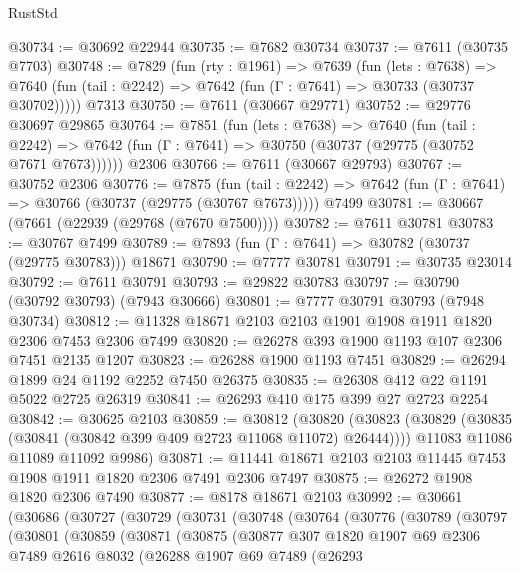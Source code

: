 \begin{lexlean}{RustStd}
\begin{coremodule}
{\begin{coremodule}
{{{{{{{{{{{{{{{{{{{{{{{{{{{{{{{{{{@30734 := @30692 @22944
@30735 := @7682 @30734
@30737 := @7611 (@30735 @7703)
@30748 := @7829
    (fun (rty : @1961) =>
    @7639
      (fun (lets : @7638) =>
      @7640 (fun (tail : @2242) => @7642 (fun (Γ : @7641) => @30733 (@30737 @30702)))))
    @7313
@30750 := @7611 (@30667 @29771)
@30752 := @29776 @30697 @29865
@30764 := @7851
    (fun (lets : @7638) =>
    @7640
      (fun (tail : @2242) =>
      @7642 (fun (Γ : @7641) => @30750 (@30737 (@29775 (@30752 @7671 @7673))))))
    @2306
@30766 := @7611 (@30667 @29793)
@30767 := @30752 @2306
@30776 := @7875
    (fun (tail : @2242) => @7642 (fun (Γ : @7641) => @30766 (@30737 (@29775 (@30767 @7673)))))
    @7499
@30781 := @30667 (@7661 (@22939 (@29768 (@7670 @7500))))
@30782 := @7611 @30781
@30783 := @30767 @7499
@30789 := @7893 (fun (Γ : @7641) => @30782 (@30737 (@29775 @30783))) @18671
@30790 := @7777 @30781
@30791 := @30735 @23014
@30792 := @7611 @30791
@30793 := @29822 @30783
@30797 := @30790 (@30792 @30793) (@7943 @30666)
@30801 := @7777 @30791 @30793 (@7948 @30734)
@30812 := @11328 @18671 @2103 @2103 @1901 @1908 @1911 @1820 @2306 @7453 @2306 @7499
@30820 := @26278 @393 @1900 @1193 @107 @2306 @7451 @2135 @1207
@30823 := @26288 @1900 @1193 @7451
@30829 := @26294 @1899 @24 @1192 @2252 @7450 @26375
@30835 := @26308 @412 @22 @1191 @5022 @2725 @26319
@30841 := @26293 @410 @175 @399 @27 @2723 @2254
@30842 := @30625 @2103
@30859 := @30812
    (@30820
      (@30823 (@30829 (@30835 (@30841 (@30842 @399 @409 @2723 @11068 @11072) @26444))))
      @11083
      @11086
      @11089
      @11092
      @9986)
@30871 := @11441 @18671 @2103 @2103 @11445 @7453 @1908 @1911 @1820 @2306 @7491 @2306 @7497
@30875 := @26272 @1908 @1820 @2306 @7490
@30877 := @8178 @18671 @2103
@30992 := @30661
    (@30686
      (@30727
        (@30729
          (@30731
            (@30748
              (@30764
                (@30776
                  (@30789
                    (@30797
                      (@30801
                        (@30859
                          (@30871
                            (@30875
                              (@30877
                                @307
                                @1820
                                @1907
                                @69
                                @2306
                                @7489
                                @2616
                                @8032
                                (@26288
                                  @1907
                                  @69
                                  @7489
                                  (@26293
}}}}}}}}}}}}}}}}}}}}}}}}}}}}}}}}}}
\end{coremodule}}
\end{coremodule}
\end{lexlean}
